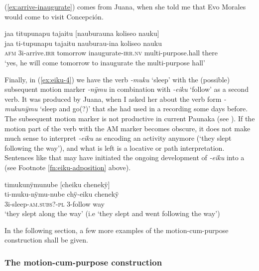 (\ref{ex:arrive-inaugurate}) comes from Juana, when she told me that Evo Morales would come to visit Concepción.

\newpage
\ea\label{ex:arrive-inaugurate}
\begingl
\glpreamble jaa titupunapu tajaitu \textup{[}nauburauna koliseo nauku\textup{]}\\
\gla jaa ti-tupunapu tajaitu nauburau-ina koliseo nauku\\
\glb \textsc{afm} 3i-arrive.\textsc{irr} tomorrow inaugurate-\textsc{irr.nv} multi-purpose.hall there\\
\glft ‘yes, he will come tomorrow to inaugurate the multi-purpose hall’
\endgl
\trailingcitation{[jxx-p150920l.013]}
\xe

Finally, in (\ref{ex:eiku-4}) we have the verb \textit{-muku} ‘sleep’ with the (possible) subsequent motion marker \textit{-nÿmu} in combination with \textit{-eiku} ‘follow’ as a second verb. It was produced by Juana, when I asked her about the verb form \textit{-mukunÿmu} ‘sleep and go(?)’ that she had used in a recording some days before. The subsequent motion marker is not productive in current Paunaka (see ). If the motion part of the verb with the AM marker becomes obscure, it does not make much sense to interpret \textit{-eiku} as encoding an activity anymore (‘they slept following the way’), and what is left is a locative or path interpretation. Sentences like that may have initiated the ongoing development of \textit{-eiku} into a  (see Footnote \ref{fn:eiku-adposition} above).

\ea\label{ex:eiku-4}
\begingl
\glpreamble timukunÿmunube \textup{[}cheiku chenekÿ\textup{]}\\
\gla ti-muku-nÿmu-nube chÿ-eiku chenekÿ\\
\glb 3i-sleep-\textsc{am.subs}?-\textsc{pl} 3-follow way\\
\glft ‘they slept along the way’ (i.e ‘they slept and went following the way’)
\endgl
\trailingcitation{[jxx-p151016l-2.007]}
\xe


 In the following section, a few more examples of the motion-cum-purpose construction shall be given.


\subsubsection{The motion-cum-purpose construction}\label{sec:MotionCumPurpose}

